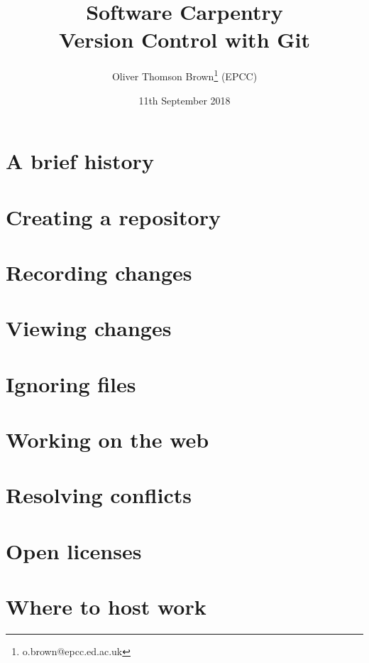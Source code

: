 \documentclass[presentation]{beamer}
\author{Oliver Thomson Brown\thanks{o.brown@epcc.ed.ac.uk} (EPCC)}
\date{11th September 2018}
\title{Software Carpentry \\ Version Control with Git}
\begin{document}
\maketitle

\section{A brief history}

\section{Creating a repository}

\section{Recording changes}

\section{Viewing changes}

\section{Ignoring files}

\section{Working on the web}

\section{Resolving conflicts}

\section{Open licenses}

\section{Where to host work}
\end{document}
